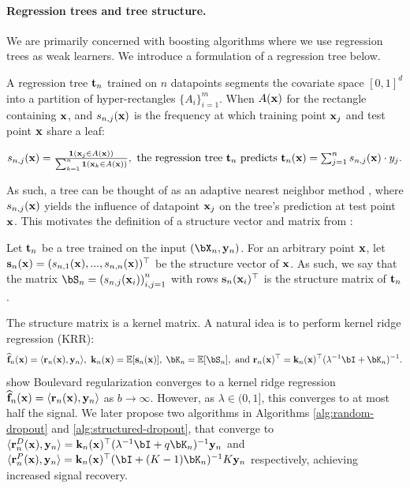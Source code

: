 \vspace{-2ex}
\paragraph{Regression trees and tree structure.} We are primarily concerned with boosting algorithms where we use regression trees as weak learners. We introduce a formulation of a regression tree below.
\begin{defn}
A regression tree $\mathbf{t}_n$ trained on $n$ datapoints segments the covariate space $[0,1]^d$ into a partition of hyper-rectangles $\{A_i\}_{i=1}^m$. When $A(\mathbf{x})$ for the rectangle containing $\mathbf{x}$, and $s_{n,j}(\mathbf{x})$ is the frequency at which training point $\mathbf{x}_j$ and test point $\mathbf{x}$ share a leaf: 
\begin{tightcenter}
    $\textstyle{s_{n,j}(\mathbf{x}) = \frac{\mathbf{1}(\mathbf{x}_j \in A(\mathbf{x}))}{\sum_{k=1}^n \mathbf{1}(\mathbf{x}_k \in A(\mathbf{x}))}, \text{ the regression tree } \mathbf{t}_n \text{ predicts }
\mathbf{t}_n(\mathbf{x}) = \sum_{j=1}^n s_{n,j}(\mathbf{x})\cdot y_j}.$
\end{tightcenter}
\label{defn:regression-trees}
\end{defn}
\vspace{-1ex}
As such, a tree can be thought of as an adaptive nearest neighbor method \citep{athey2018generalizedrandomforests, friedberg2021locallinearforests}, where $s_{n,j}(\mathbf{x})$ yields the influence of datapoint $\mathbf{x}_j$ on the tree's prediction at test point $\mathbf{x}$. This motivates the definition of a structure vector and matrix from \cite{zhou2022boulevard}:
\vspace{-2ex}
\begin{defn}
    Let $\mathbf{t}_n$ be a tree trained on the input $(\bX_n, \by_n)$. For an arbitrary point $\mathbf{x}$, let $\mathbf{s}_n(\mathbf{x}) = (s_{n,1}(\mathbf{x}),...,s_{n,n}(\mathbf{x}))^\top$ be the structure vector of $\mathbf{x}$. As such, we say that the matrix $\bS_n = \left(s_{n,j}(\bx_i)\right)_{i,j=1}^n$ with rows $\mathbf{s}_n(\mathbf{x}_i)^\top$ is the structure matrix of $\mathbf{t}_n$.
    \label{defn:structure-matrix}
\end{defn}
\vspace{-1ex}
The structure matrix is a kernel matrix. A natural idea is to perform kernel ridge regression (KRR):
$$\widehat{\f}_n(\bx) = \langle\br_n(\bx), \by_n\rangle, \text{ } \bk_n(\bx) = \E[\bs_n(\bx)], \; \bK_n = \E[\bS_n], \text{ and } \br_n(\bx)^\top = \bk_n(\bx)^\top (\lambda^{-1}\bI + \bK_n)^{-1}.$$
\cite{zhou2022boulevard} show Boulevard regularization converges to a kernel ridge regression $\widehat{\mathbf{f}}_n(\mathbf{x}) = \langle \mathbf{r}_n(\mathbf{x}), \mathbf{y}_n\rangle$ as $b \to \infty$. However, as $\lambda \in (0,1]$, this converges to at most half the signal. We later propose two algorithms in Algorithms \ref{alg:random-dropout} and \ref{alg:structured-dropout}, that converge to $\langle\br_n^D(\bx), \by_n\rangle = \bk_n(\bx)^\top (\lambda^{-1}\bI + q\bK_n)^{-1} \by_n$ and $\langle\br_n^P(\bx), \by_n\rangle = \bk_n(\bx)^\top (\bI + (K-1)\bK_n)^{-1}K \by_n$ respectively, achieving increased signal recovery. 
